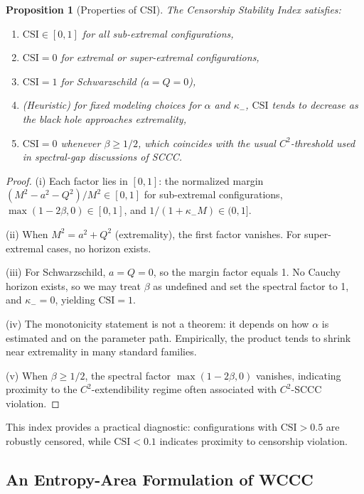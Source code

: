 \documentclass[12pt,a4paper]{article}
\newtheorem{proposition}[theorem]{Proposition}
\begin{document}
\begin{proposition}[Properties of CSI]
The Censorship Stability Index satisfies:
\begin{enumerate}[label=(\roman*)]
    \item $\text{CSI} \in [0, 1]$ for all sub-extremal configurations,
    \item $\text{CSI} = 0$ for extremal or super-extremal configurations,
    \item $\text{CSI} = 1$ for Schwarzschild ($a = Q = 0$),
    \item (Heuristic) for fixed modeling choices for $\alpha$ and $\kappa_-$, $\text{CSI}$ tends to decrease as the black hole approaches extremality,
    \item $\text{CSI} = 0$ whenever $\beta \geq 1/2$, which coincides with the usual $C^2$-threshold used in spectral-gap discussions of SCCC.
\end{enumerate}
\end{proposition}

\begin{proof}
(i) Each factor lies in $[0,1]$: the normalized margin $(M^2-a^2-Q^2)/M^2 \in [0,1]$ for sub-extremal configurations, $\max(1-2\beta,0)\in[0,1]$, and $1/(1+\kappa_- M) \in (0,1]$.

(ii) When $M^2 = a^2 + Q^2$ (extremality), the first factor vanishes. For super-extremal cases, no horizon exists.

(iii) For Schwarzschild, $a = Q = 0$, so the margin factor equals 1. No Cauchy horizon exists, so we may treat $\beta$ as undefined and set the spectral factor to 1, and $\kappa_- = 0$, yielding $\text{CSI} = 1$.

(iv) The monotonicity statement is not a theorem: it depends on how $\alpha$ is estimated and on the parameter path. Empirically, the product tends to shrink near extremality in many standard families.

(v) When $\beta \geq 1/2$, the spectral factor $\max(1-2\beta,0)$ vanishes, indicating proximity to the $C^2$-extendibility regime often associated with $C^2$-SCCC violation.
\end{proof}

This index provides a practical diagnostic: configurations with $\text{CSI} > 0.5$ are robustly censored, while $\text{CSI} < 0.1$ indicates proximity to censorship violation.

\subsection{An Entropy-Area Formulation of WCCC}
\end{document}
